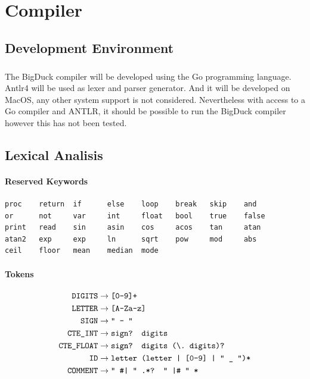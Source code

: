 
\chapter{Compiler}

\section{Development Environment}

\paragraph{} The BigDuck compiler will be developed using the Go programming
language. Antlr4 will be used as lexer and parser generator. And it will be
developed on MacOS, any other system support is not considered. Nevertheless
with access to a Go compiler and ANTLR, it should be possible to run the
BigDuck compiler however this has not been tested.

\section{Lexical Analisis}

\subsubsection{Reserved Keywords}
\begin{verbatim}
proc    return  if      else    loop    break   skip    and
or      not     var     int     float   bool    true    false
print   read    sin     asin    cos     acos    tan     atan
atan2   exp     exp     ln      sqrt    pow     mod     abs
ceil    floor   mean    median  mode
\end{verbatim}

\subsubsection{Tokens}
\begin{align*}
	\texttt{DIGITS}
	&\rightarrow\texttt{[0-9]+}\\
	\texttt{LETTER}
	&\rightarrow\texttt{[A-Za-z]}\\
	\texttt{SIGN}
	&\rightarrow\texttt{`` - ''}\\
	\texttt{CTE\_INT}
	&\rightarrow\texttt{sign? digits}\\
	\texttt{CTE\_FLOAT}
	&\rightarrow\texttt{sign? digits (\textbackslash.\ digits)?}\\
	\texttt{ID}
	&\rightarrow\texttt{letter (letter | [0-9] | `` \_ '')*}\\
	\texttt{COMMENT}
	&\rightarrow\texttt{`` \#| '' \phantom{}.*? `` |\# '' *}\\
\end{align*}


